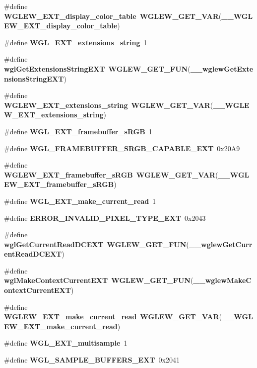 \begin{DoxyCompactItemize}
\item 
\#define {\bf W\+G\+L\+E\+W\+\_\+\+E\+X\+T\+\_\+display\+\_\+color\+\_\+table}~{\bf W\+G\+L\+E\+W\+\_\+\+G\+E\+T\+\_\+\+V\+AR}({\bf \+\_\+\+\_\+\+W\+G\+L\+E\+W\+\_\+\+E\+X\+T\+\_\+display\+\_\+color\+\_\+table})
\item 
\#define {\bf W\+G\+L\+\_\+\+E\+X\+T\+\_\+extensions\+\_\+string}~1
\item 
\#define {\bf wgl\+Get\+Extensions\+String\+E\+XT}~{\bf W\+G\+L\+E\+W\+\_\+\+G\+E\+T\+\_\+\+F\+UN}({\bf \+\_\+\+\_\+wglew\+Get\+Extensions\+String\+E\+XT})
\item 
\#define {\bf W\+G\+L\+E\+W\+\_\+\+E\+X\+T\+\_\+extensions\+\_\+string}~{\bf W\+G\+L\+E\+W\+\_\+\+G\+E\+T\+\_\+\+V\+AR}({\bf \+\_\+\+\_\+\+W\+G\+L\+E\+W\+\_\+\+E\+X\+T\+\_\+extensions\+\_\+string})
\item 
\#define {\bf W\+G\+L\+\_\+\+E\+X\+T\+\_\+framebuffer\+\_\+s\+R\+GB}~1
\item 
\#define {\bf W\+G\+L\+\_\+\+F\+R\+A\+M\+E\+B\+U\+F\+F\+E\+R\+\_\+\+S\+R\+G\+B\+\_\+\+C\+A\+P\+A\+B\+L\+E\+\_\+\+E\+XT}~0x20\+A9
\item 
\#define {\bf W\+G\+L\+E\+W\+\_\+\+E\+X\+T\+\_\+framebuffer\+\_\+s\+R\+GB}~{\bf W\+G\+L\+E\+W\+\_\+\+G\+E\+T\+\_\+\+V\+AR}({\bf \+\_\+\+\_\+\+W\+G\+L\+E\+W\+\_\+\+E\+X\+T\+\_\+framebuffer\+\_\+s\+R\+GB})
\item 
\#define {\bf W\+G\+L\+\_\+\+E\+X\+T\+\_\+make\+\_\+current\+\_\+read}~1
\item 
\#define {\bf E\+R\+R\+O\+R\+\_\+\+I\+N\+V\+A\+L\+I\+D\+\_\+\+P\+I\+X\+E\+L\+\_\+\+T\+Y\+P\+E\+\_\+\+E\+XT}~0x2043
\item 
\#define {\bf wgl\+Get\+Current\+Read\+D\+C\+E\+XT}~{\bf W\+G\+L\+E\+W\+\_\+\+G\+E\+T\+\_\+\+F\+UN}({\bf \+\_\+\+\_\+wglew\+Get\+Current\+Read\+D\+C\+E\+XT})
\item 
\#define {\bf wgl\+Make\+Context\+Current\+E\+XT}~{\bf W\+G\+L\+E\+W\+\_\+\+G\+E\+T\+\_\+\+F\+UN}({\bf \+\_\+\+\_\+wglew\+Make\+Context\+Current\+E\+XT})
\item 
\#define {\bf W\+G\+L\+E\+W\+\_\+\+E\+X\+T\+\_\+make\+\_\+current\+\_\+read}~{\bf W\+G\+L\+E\+W\+\_\+\+G\+E\+T\+\_\+\+V\+AR}({\bf \+\_\+\+\_\+\+W\+G\+L\+E\+W\+\_\+\+E\+X\+T\+\_\+make\+\_\+current\+\_\+read})
\item 
\#define {\bf W\+G\+L\+\_\+\+E\+X\+T\+\_\+multisample}~1
\item 
\#define {\bf W\+G\+L\+\_\+\+S\+A\+M\+P\+L\+E\+\_\+\+B\+U\+F\+F\+E\+R\+S\+\_\+\+E\+XT}~0x2041
\item 

\end{DoxyCompactItemize}
